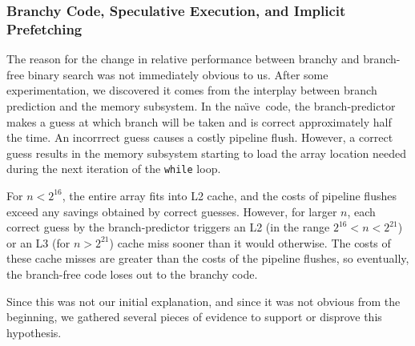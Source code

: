 \documentclass{patmorin}
\newcommand{\naive}{na\"{\i}ve}
\begin{document}
\subsubsection{Branchy Code, Speculative Execution, and Implicit Prefetching}

The reason for the change in relative performance between branchy
and branch-free binary search was not immediately obvious to us.
After some experimentation, we discovered it comes from the interplay
between branch prediction and the memory subsystem.  In the \naive\
code, the branch-predictor makes a guess at which branch will be taken
and is correct approximately half the time. An incorrrect guess causes a
costly pipeline flush.  However, a correct guess results in the memory
subsystem starting to load the array location needed during the next
iteration of the \texttt{while} loop.

For $n<2^{16}$, the entire array fits into L2 cache, and the costs
of pipeline flushes exceed any savings obtained by correct guesses.
However, for larger $n$, each correct guess by the branch-predictor
triggers an L2 (in the range $2^{16}<n<2^{21}$) or an L3 (for $n>2^{21}$)
cache miss sooner than it would otherwise.  The costs of these cache
misses are greater than the costs of the pipeline flushes, so eventually,
the branch-free code loses out to the branchy code.

Since this was not our initial explanation, and since it was not obvious
from the beginning, we gathered several pieces of evidence to support
or disprove this hypothesis.
\end{document}
